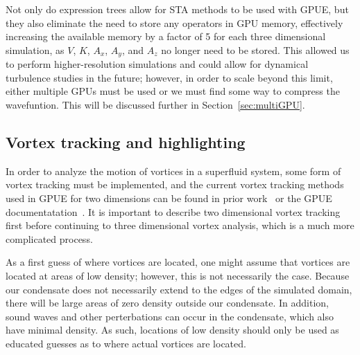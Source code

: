 Not only do expression trees allow for STA methods to be used with GPUE, but they also eliminate the need to store any operators in GPU memory, effectively increasing the available memory by a factor of 5 for each three dimensional simulation, as $V$, $K$, $A_x$, $A_y$, and $A_z$ no longer need to be stored.
This allowed us to perform higher-resolution simulations and could allow for dynamical turbulence studies in the future; however, in order to scale beyond this limit, either multiple GPUs must be used or we must find some way to compress the wavefuntion.
This will be discussed further in Section~\ref{sec:multiGPU}.

\subsection{Vortex tracking and highlighting}
\label{sec:tracking}

In order to analyze the motion of vortices in a superfluid system, some form of vortex tracking must be implemented, and the current vortex tracking methods used in GPUE for two dimensions can be found in prior work~\cite{o2017} or the GPUE documentatation~\cite{docs}.
It is important to describe two dimensional vortex tracking first before continuing to three dimensional vortex analysis, which is a much more complicated process.

As a first guess of where vortices are located, one might assume that vortices are located at areas of low density; however, this is not necessarily the case.
Because our condensate does not necessarily extend to the edges of the simulated domain, there will be large areas of zero density outside our condensate.
In addition, sound waves and other perterbations can occur in the condensate, which also have minimal density.
As such, locations of low density should only be used as educated guesses as to where actual vortices are located.

